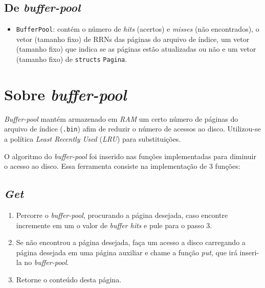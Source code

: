 \documentclass[
	12pt,				%
	openany,			%
	twoside,			%
	a4paper,			%
	english,			%
	french,				%
	spanish,			%
	brazil,				%
	]{abntex2}
\begin{document}
    \subsection{De \textit{buffer-pool}}
        \begin{itemize}
            \item \verb|BufferPool|: contém o número de \textit{hits} (acertos) e \textit{misses} (não encontrados), o vetor (tamanho fixo) de RRNs das páginas  do arquivo de índice, um vetor (tamanho fixo) que indica se as páginas estão atualizadas ou não e um vetor (tamanho fixo) de \verb|structs| \verb|Pagina|.
        \end{itemize}
\section{Sobre \textit{buffer-pool}}\label{bufferpool}

    \textit{Buffer-pool} mantém armazenado em \textit{RAM} um certo número de páginas do arquivo de índice (\verb|.bin|) afim de reduzir o número de acessos ao disco. Utilizou-se a política \textit{Least Recently Used} (\textit{LRU}) para substituições.
    
    O algoritmo do \textit{buffer-pool} foi inserido nas funções implementadas para diminuir o acesso ao disco. Essa ferramenta consiste na implementação de 3 funções:
    
    \subsection{\textit{Get}}
        \begin{enumerate}
            \item Percorre o \textit{buffer-pool}, procurando a página desejada, caso encontre incremente em um o valor de \textit{buffer hits} e pule para o passo 3.
            \item Se não encontrou a página desejada, faça um acesso a disco carregando a página desejada em uma página auxiliar e chame a função \textit{put}, que irá inseri-la no \textit{buffer-pool}.
            \item Retorne o conteúdo desta página.
        \end{enumerate}
\end{document}
